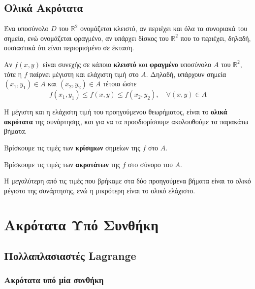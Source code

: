 \documentclass[a4paper,table]{report}
\begin{document}
\section{Ολικά Ακρότατα}

Ένα υποσύνολο $D$ του $ \mathbb{R}^{2} $ ονομάζεται \textcolor{Col1}{κλειστό}, αν 
περιέχει και όλα τα συνοριακά του σημεία, ενώ ονομάζεται \textcolor{Col1}{φραγμένο}, αν 
υπάρχει δίσκος του $ \mathbb{R}^{2} $ που το περιέχει, δηλαδή, ουσιαστικά ότι είναι 
περιορισμένο σε έκταση.

\begin{thm}
  Αν $f(x,y)$ είναι συνεχής σε κάποιο \textbf{κλειστό} και \textbf{φραγμένο} υποσύνολο 
  $A$ του $ \mathbb{R}^{2} $, τότε η $f$ παίρνει μέγιστη και ελάχιστη τιμή στο $A$. 
  Δηλαδή, υπάρχουν σημεία $ (x_{1}, y_{1}) \in A $ και $ (x_{2}, y_{2}) \in A $ τέτοια 
  ώστε 
  \[
    f(x_{1}, y_{1}) \leq f(x,y) \leq f(x_{2}, y_{2}), \quad \forall (x,y) \in A
  \]
\end{thm}

Η μέγιστη και η ελάχιστη τιμή του προηγούμενου θεωρήματος, είναι το \textbf{ολικά
ακρότατα} της συνάρτησης, και για να τα προσδιορίσουμε ακολουθούμε τα παρακάτω βήματα.

\begin{myitemize}
  \item Βρίσκουμε τις τιμές των \textbf{κρίσιμων} σημείων της $f$ στο $A$.
  \item Βρίσκουμε τις τιμές των \textbf{ακροτάτων} της $f$ στο σύνορο του $A$. 
  \item Η μεγαλύτερη από τις τιμές που βρήκαμε στα δύο προηγούμενα βήματα 
    είναι το ολικό μέγιστο της συνάρτησης, ενώ η μικρότερη είναι το ολικό ελάχιστο.
\end{myitemize}




\chapter{Ακρότατα Υπό Συνθήκη}

\section{Πολλαπλασιαστές Lagrange}

\subsection{Ακρότατα υπό μία συνθήκη}

\enlargethispage{2\baselineskip}
\end{document}
